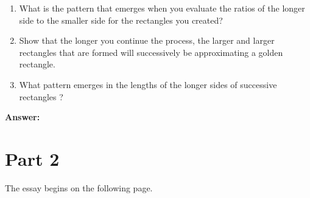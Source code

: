 \documentclass[letterpaper, 12pt]{article}
\begin{document}
\begin{enumerate}
\begin{enumerate}
	\item What is the pattern that emerges when you evaluate the ratios of the longer side to the smaller side for the rectangles you created?

	\item Show that the longer you continue the process, the larger and larger rectangles that are formed will successively be approximating a golden rectangle.

	\item What pattern emerges in the lengths of the longer sides of successive rectangles ?
\end{enumerate}
\textbf{Answer:}
\end{enumerate}

\section*{Part 2}
The essay begins on the following page. 
\pagebreak
\end{document}
